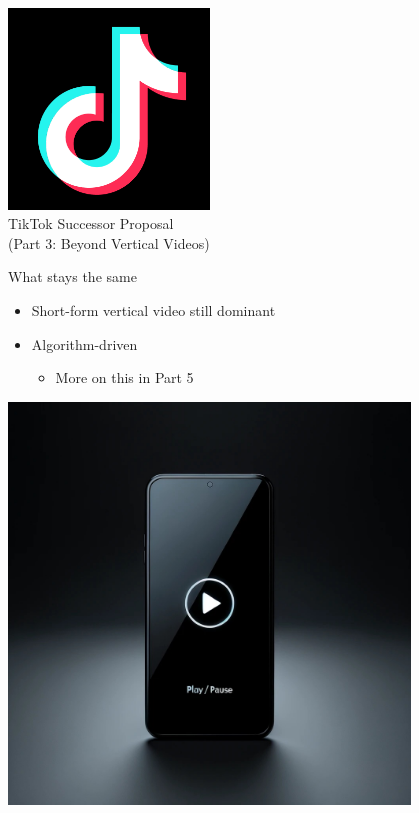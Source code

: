 \documentclass[aspectratio=35]{beamer} %
\begin{document}
\begin{frame}
\centering
\vspace{-1in}
\includegraphics[width=0.4\textwidth]{imgs/app_icons/tiktok-icon2.png}\\
TikTok Successor Proposal \\
(Part 3: Beyond Vertical Videos)
\end{frame}

\begin{frame}{What stays the same}
\vspace{-0.7in}
\begin{itemize}
    \item Short-form vertical video still dominant
    \item Algorithm-driven
    \begin{itemize}
        \item More on this in Part 5
    \end{itemize}
\end{itemize}
\centering
\includegraphics[width=0.8\textwidth]{imgs/media/vertical_vid.jpeg}
\end{frame}
\end{document}
